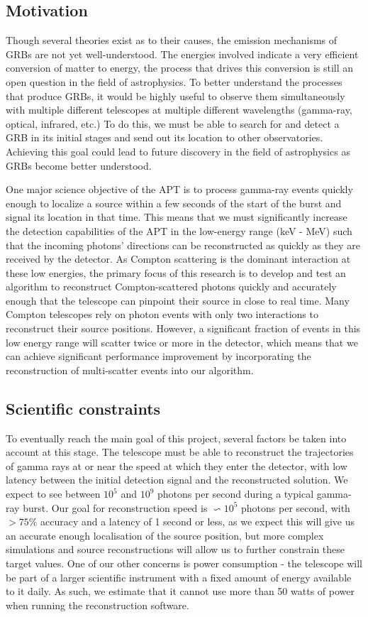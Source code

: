 \subsection{Motivation}
Though several theories exist as to their causes, the emission mechanisms of GRBs are not yet well-understood. The energies involved indicate a very efficient conversion of matter to energy, the process that drives this conversion is still an open question in the field of astrophysics. To better understand the processes that produce GRBs, it would be highly useful to observe them simultaneously with multiple different telescopes at multiple different wavelengths (gamma-ray, optical, infrared, etc.) To do this, we must be able to search for and detect a GRB in its initial stages and send out its location to other observatories. Achieving this goal could lead to future discovery in the field of astrophysics as GRBs become better understood.

One major science objective of the APT is to process gamma-ray events quickly enough to localize a source within a few seconds of the start of the burst and signal its location in that time. This means that we must significantly increase the detection capabilities of the APT in the low-energy range (keV - MeV) such that the incoming photons' directions can be reconstructed as quickly as they are received by the detector. As Compton scattering is the dominant interaction at these low energies, the primary focus of this research is to develop and test an algorithm to reconstruct Compton-scattered photons quickly and accurately enough that the telescope can pinpoint their source in close to real time. Many Compton telescopes rely on photon events with only two interactions to reconstruct their source positions. However, a significant fraction of events in this low energy range will scatter twice or more in the detector, which means that we can achieve significant performance improvement by incorporating the reconstruction of multi-scatter events into our algorithm.

\subsection{Scientific constraints}

To eventually reach the main goal of this project, several factors be taken into account at this stage. The telescope must be able to reconstruct the trajectories of gamma rays at or near the speed at which they enter the detector, with low latency between the initial detection signal and the reconstructed solution. We expect to see between $10^5$ and $10^9$ photons per second during a typical gamma-ray burst\cite{UMD}. Our goal for reconstruction speed is $\backsim 10^5$ photons per second, with $>75\%$ accuracy and a latency of 1 second or less, as we expect this will give us an accurate enough localisation of the source position, but more complex simulations and source reconstructions will allow us to further constrain these target values. One of our other concerns is power consumption - the telescope will be part of a larger scientific instrument with a fixed amount of energy available to it daily. As such, we estimate that it cannot use more than 50 watts of power when running the reconstruction software.

